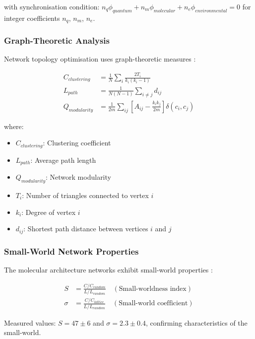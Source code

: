 \documentclass[12pt,a4paper]{article}
\begin{document}
with synchronisation condition: $n_q \phi_{quantum} + n_m \phi_{molecular} + n_e \phi_{environmental} = 0$ for integer coefficients $n_q$, $n_m$, $n_e$.


\subsubsection{Graph-Theoretic Analysis}

Network topology optimisation uses graph-theoretic measures \cite{newman2010networks,barabasi2016network}:

\begin{align}
C_{clustering} &= \frac{1}{N} \sum_i \frac{2T_i}{k_i(k_i-1)} \\
L_{path} &= \frac{1}{N(N-1)} \sum_{i \neq j} d_{ij} \\
Q_{modularity} &= \frac{1}{2m} \sum_{ij} \left[ A_{ij} - \frac{k_i k_j}{2m} \right] \delta(c_i, c_j)
\end{align}

where:
\begin{itemize}
\item $C_{clustering}$: Clustering coefficient
\item $L_{path}$: Average path length  
\item $Q_{modularity}$: Network modularity
\item $T_i$: Number of triangles connected to vertex $i$
\item $k_i$: Degree of vertex $i$
\item $d_{ij}$: Shortest path distance between vertices $i$ and $j$
\end{itemize}

\subsubsection{Small-World Network Properties}

The molecular architecture networks exhibit small-world properties \cite{watts1998collective}:

\begin{align}
S &= \frac{C/C_{random}}{L/L_{random}} \quad (\text{Small-worldness index}) \\
\sigma &= \frac{C/C_{lattice}}{L/L_{random}} \quad (\text{Small-world coefficient})
\end{align}

Measured values: $S = 47 \pm 6$ and $\sigma = 2.3 \pm 0.4$, confirming characteristics of the small-world.
\end{document}
